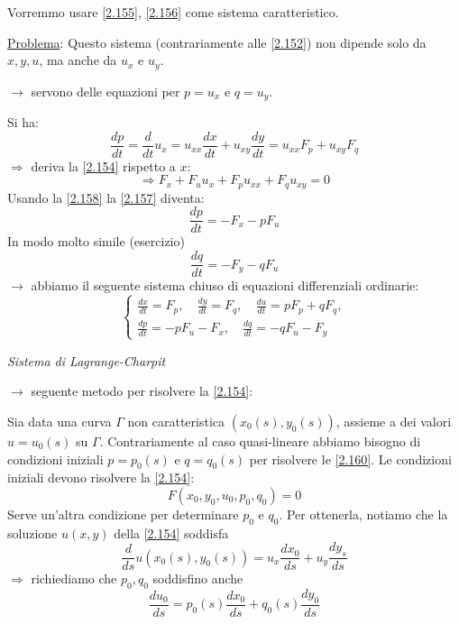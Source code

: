 \documentclass[a4paper,11pt]{report}
\begin{document}
Vorremmo usare \eqref{2.155}, \eqref{2.156} come sistema caratteristico.

\underline{Problema}: Questo sistema (contrariamente alle \eqref{2.152}) non dipende solo da $x,y,u$, ma anche da $u_x$ e $u_y$.

$\rightarrow$ servono delle equazioni per $p=u_x$ e $q=u_y$.

Si ha:
\begin{equation}
\frac{dp}{dt}=\frac{d}{dt}u_x = u_{xx}\frac{dx}{dt} + u_{xy}\frac{dy}{dt}=u_{xx}F_p + u_{xy}F_q
\label{2.157}
\end{equation}
$\Rightarrow$ deriva la \eqref{2.154} rispetto a $x$:
\begin{equation}
\Rightarrow F_x + F_u u_x + F_p u_{xx} + F_q u_{xy}=0
\label{2.158}
\end{equation}
Usando la \eqref{2.158} la \eqref{2.157} diventa:
\begin{equation}
\frac{dp}{dt}=-F_x - p F_u
\label{2.159}
\end{equation}
In modo molto simile (esercizio)
\begin{equation}
\frac{dq}{dt}=-F_y - qF_u 
\label{2.159'}
\tag{$\theequation^\prime$}
\end{equation}
$\rightarrow$ abbiamo il seguente sistema chiuso di equazioni differenziali ordinarie:
\begin{equation}
\begin{cases}
\frac{dx}{dt}= F_p,\quad \frac{dy}{dt}=F_q, \quad \frac{du}{dt}=pF_p + qF_q,\\
\frac{dp}{dt}= - p F_u - F_x, \quad \frac{dq}{dt}=-q F_u - F_y 
\end{cases}
\label{2.160}
\end{equation}
\centerline{\emph{Sistema di Lagrange-Charpit}}

$\rightarrow$ seguente metodo per risolvere la \eqref{2.154}:

Sia data una curva $\Gamma$ non caratteristica $(x_0(s),y_0(s))$, assieme a dei valori $u=u_0(s)$ su $\Gamma$.
Contrariamente al caso quasi-lineare abbiamo bisogno di condizioni iniziali $p=p_0(s)$ e $q=q_0(s)$ per risolvere le \eqref{2.160}. Le condizioni iniziali devono risolvere la \eqref{2.154}: 
\begin{equation}
F(x_0,y_0,u_0,p_0,q_0)=0 
\label{2.161}
\end{equation}
Serve un'altra condizione per determinare $p_0$ e $q_0$.
Per ottenerla, notiamo che la soluzione $u(x,y)$ della \eqref{2.154} soddisfa 
\[
\frac{d}{ds}u(x_0(s), y_0(s))=u_x\frac{dx_0}{ds}+u_y\frac{dy_s}{ds}
\]
$\Rightarrow$ richiediamo che $p_0, q_0$ soddisfino anche
\begin{equation}
\frac{du_0}{ds}=p_0(s)\frac{dx_0}{ds}+ q_0(s)\frac{dy_0}{ds}
\label{2.162}
\end{equation}
\end{document}
